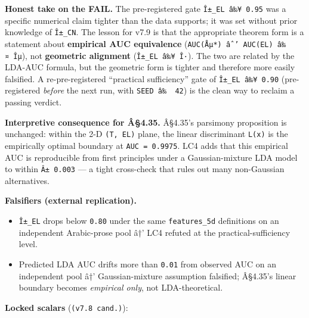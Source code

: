 \documentclass[
]{article}
\providecommand{\tightlist}{%
  \setlength{\itemsep}{0pt}\setlength{\parskip}{0pt}}
\begin{document}
\textbf{Honest take on the FAIL.} The pre-registered gate
\texttt{Î±\_EL\ â‰¥\ 0.95} was a specific numerical claim tighter than
the data supports; it was set without prior knowledge of
\texttt{Î±\_CN}. The lesson for v7.9 is that the appropriate theorem
form is a statement about \textbf{empirical AUC equivalence}
(\texttt{\textbar{}AUC(Åµ*)\ âˆ’\ AUC(EL)\textbar{}\ â‰¤\ Îµ}), not
\textbf{geometric alignment} (\texttt{Î±\_EL\ â‰¥\ Î·}). The two are
related by the LDA-AUC formula, but the geometric form is tighter and
therefore more easily falsified. A re-pre-registered ``practical
sufficiency'' gate of \texttt{Î±\_EL\ â‰¥\ 0.90} (pre-registered
\emph{before} the next run, with \texttt{SEED\ â‰~\ 42}) is the clean
way to reclaim a passing verdict.

\textbf{Interpretive consequence for Â§4.35.} Â§4.35's parsimony
proposition is unchanged: within the 2-D \texttt{(T,\ EL)} plane, the
linear discriminant \texttt{L(x)} is the empirically optimal boundary at
\texttt{AUC\ =\ 0.9975}. LC4 adds that this empirical AUC is
reproducible from first principles under a Gaussian-mixture LDA model to
within \texttt{Â±\ 0.003} --- a tight cross-check that rules out many
non-Gaussian alternatives.

\textbf{Falsifiers (external replication).}

\begin{itemize}
\tightlist
\item
  \texttt{Î±\_EL} drops below \texttt{0.80} under the same
  \texttt{features\_5d} definitions on an independent Arabic-prose pool
  â†' LC4 refuted at the practical-sufficiency level.
\item
  Predicted LDA AUC drifts more than \texttt{0.01} from observed AUC on
  an independent pool â†' Gaussian-mixture assumption falsified;
  Â§4.35's linear boundary becomes \emph{empirical only}, not
  LDA-theoretical.
\end{itemize}

\textbf{Locked scalars} (\texttt{(v7.8\ cand.)}):
\end{document}
